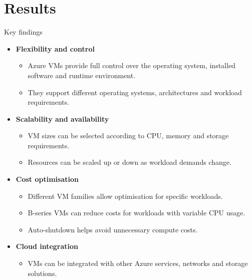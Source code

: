 \documentclass[aspectratio=169,xcolor=dvipsnames]{beamer}
\begin{document}
\section{Results}
\begin{frame}{Key findings}
\begin{itemize}
    \item \textbf{Flexibility and control}
    \begin{itemize}
        \item Azure VMs provide full control over the operating system,
        installed software and runtime environment.
        \item They support different operating systems, architectures
        and workload requirements.
    \end{itemize}

    \item \textbf{Scalability and availability}
    \begin{itemize}
        \item VM sizes can be selected according to CPU, memory and
        storage requirements.
        \item Resources can be scaled up or down as workload demands change.
    \end{itemize}

    \item \textbf{Cost optimisation}
    \begin{itemize}
        \item Different VM families allow optimisation for specific workloads.
        \item B-series VMs can reduce costs for workloads with variable CPU usage.
        \item Auto-shutdown helps avoid unnecessary compute costs.
    \end{itemize}

    \item \textbf{Cloud integration}
    \begin{itemize}
        \item VMs can be integrated with other Azure services,
        networks and storage solutions.
    \end{itemize}
\end{itemize}
\end{frame}
\end{document}
